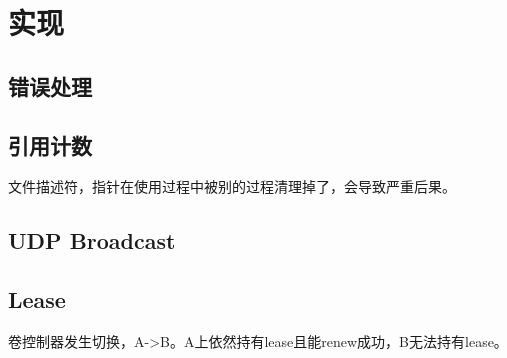 \chapter{实现}

\section{错误处理}

\section{引用计数}

文件描述符，指针在使用过程中被别的过程清理掉了，会导致严重后果。

\section{UDP Broadcast}

\section{Lease}

卷控制器发生切换，A->B。A上依然持有lease且能renew成功，B无法持有lease。
